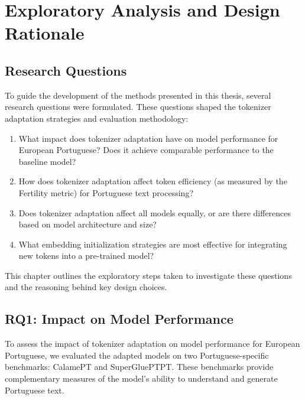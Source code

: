 
\chapter{Exploratory Analysis and Design Rationale}


\label{chap:exploration}

\section{Research Questions}
\label{sec:research_questions}

To guide the development of the methods presented in this thesis, several research questions were formulated. These questions shaped the tokenizer adaptation strategies and evaluation methodology:

\begin{enumerate}
    \item What impact does tokenizer adaptation have on model performance for European Portuguese? Does it achieve comparable performance to the baseline model?
    
    \item How does tokenizer adaptation affect token efficiency (as measured by the Fertility metric) for Portuguese text processing?
    
    \item Does tokenizer adaptation affect all models equally, or are there differences based on model architecture and size? 
    
    \item What embedding initialization strategies are most effective for integrating new tokens into a pre-trained model?
\end{enumerate}

This chapter outlines the exploratory steps taken to investigate these questions and the reasoning behind key design choices.

\section{RQ1: Impact on Model Performance}
\label{sec:model_performance}

To assess the impact of tokenizer adaptation on model performance for European Portuguese, we evaluated the adapted models on two Portuguese-specific benchmarks: CalamePT and SuperGluePTPT. These benchmarks provide complementary measures of the model's ability to understand and generate Portuguese text.

